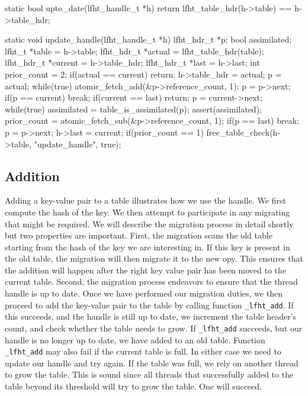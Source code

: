 \begin{center}
\begin{clisting}
static bool upto_date(lfht_handle_t *h){
  return lfht_table_hdr(h->table) == h->table_hdr;
}

static void update_handle(lfht_handle_t *h){
  lfht_hdr_t *p;
  bool assimilated;
  lfht_t *table = h->table;
  lfht_hdr_t *actual = lfht_table_hdr(table);
  lfht_hdr_t *current  = h->table_hdr;
  lfht_hdr_t *last = h->last;
  int prior_count = 2;
  if(actual == current){
    return;
  }
  h->table_hdr = actual;
  p = actual;
  while(true){
    atomic_fetch_add(&p->reference_count, 1);
    p = p->next;
    if(p == current){ break; }
  }
  if(current == last){  return; }
  p = current->next;
  while(true){
    assimilated = table_is_assimilated(p);
    assert(assimilated);
    prior_count = atomic_fetch_sub(&p->reference_count, 1);
    if(p == last){ break; }
    p = p->next;
  }
  h->last = current;
  if(prior_count == 1){
    free_table_check(h->table, "update_handle", true);
  }
}
\end{clisting}
\end{center}

\subsection{Addition}

Adding a key-value pair to a table illustrates how we use the
handle. We first compute the hash of the key. We then attempt to
participate in any migrating that might be required. We will describe
the migration process in detail shortly but two properties are
important.  First, the migration scans the old table starting from the
hash of the key we are interesting in. If this key is present in the
old table, the migration will then migrate it to the new opy. This
ensures that the addition will happen after the right key value pair
has been moved to the current table. Second, the migration process
endeavors to ensure that the thread handle is up to date.  Once we
have performed our migration duties, we then proceed to add the
key-value pair to the table by calling function \texttt{\_lfht\_add}.
If this succeeds, and the handle is still up to date, we increment the
table header's count, and check whether the table needs to grow.  If
\texttt{\_lfht\_add} succeeds, but our handle is no longer up to date,
we have added to an old table. Function \texttt{\_lfht\_add} may also fail
if the current table is full.
In either case we need to update our handle and try again. If the
table was full, we rely on another thread to grow the table. This is
sound since all threads that successfully added to the table beyond
its threshold will try to grow the table. One will succeed.

